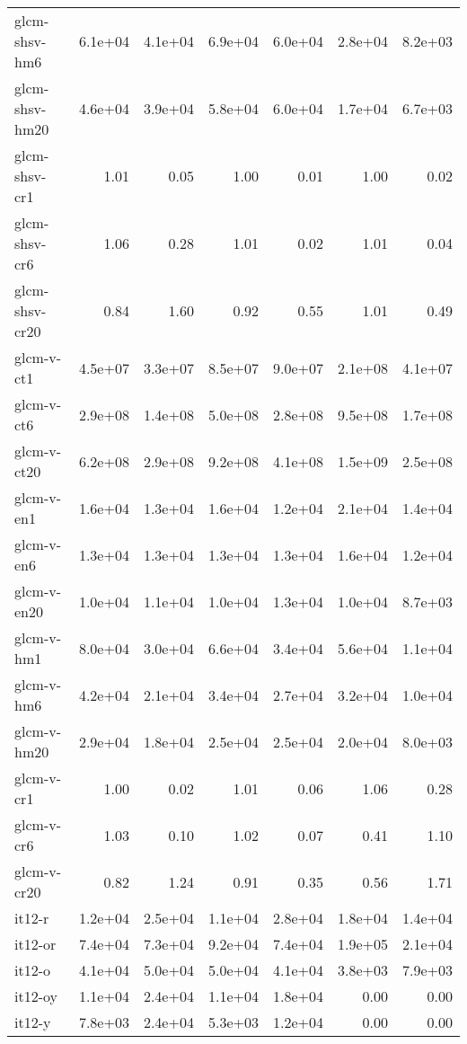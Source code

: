 \begin{tabular}{lrrrrrr}
glcm-shsv-hm6       & 6.1e+04 & 4.1e+04 & 6.9e+04 & 6.0e+04 & 2.8e+04 & 8.2e+03 \\
glcm-shsv-hm20      & 4.6e+04 & 3.9e+04 & 5.8e+04 & 6.0e+04 & 1.7e+04 & 6.7e+03 \\
glcm-shsv-cr1       &    1.01 &    0.05 &    1.00 &    0.01 &    1.00 &    0.02 \\
glcm-shsv-cr6       &    1.06 &    0.28 &    1.01 &    0.02 &    1.01 &    0.04 \\
glcm-shsv-cr20      &    0.84 &    1.60 &    0.92 &    0.55 &    1.01 &    0.49 \\
glcm-v-ct1          & 4.5e+07 & 3.3e+07 & 8.5e+07 & 9.0e+07 & 2.1e+08 & 4.1e+07 \\
glcm-v-ct6          & 2.9e+08 & 1.4e+08 & 5.0e+08 & 2.8e+08 & 9.5e+08 & 1.7e+08 \\
glcm-v-ct20         & 6.2e+08 & 2.9e+08 & 9.2e+08 & 4.1e+08 & 1.5e+09 & 2.5e+08 \\
glcm-v-en1          & 1.6e+04 & 1.3e+04 & 1.6e+04 & 1.2e+04 & 2.1e+04 & 1.4e+04 \\
glcm-v-en6          & 1.3e+04 & 1.3e+04 & 1.3e+04 & 1.3e+04 & 1.6e+04 & 1.2e+04 \\
glcm-v-en20         & 1.0e+04 & 1.1e+04 & 1.0e+04 & 1.3e+04 & 1.0e+04 & 8.7e+03 \\
glcm-v-hm1          & 8.0e+04 & 3.0e+04 & 6.6e+04 & 3.4e+04 & 5.6e+04 & 1.1e+04 \\
glcm-v-hm6          & 4.2e+04 & 2.1e+04 & 3.4e+04 & 2.7e+04 & 3.2e+04 & 1.0e+04 \\
glcm-v-hm20         & 2.9e+04 & 1.8e+04 & 2.5e+04 & 2.5e+04 & 2.0e+04 & 8.0e+03 \\
glcm-v-cr1          &    1.00 &    0.02 &    1.01 &    0.06 &    1.06 &    0.28 \\
glcm-v-cr6          &    1.03 &    0.10 &    1.02 &    0.07 &    0.41 &    1.10 \\
glcm-v-cr20         &    0.82 &    1.24 &    0.91 &    0.35 &    0.56 &    1.71 \\
it12-r              & 1.2e+04 & 2.5e+04 & 1.1e+04 & 2.8e+04 & 1.8e+04 & 1.4e+04 \\
it12-or             & 7.4e+04 & 7.3e+04 & 9.2e+04 & 7.4e+04 & 1.9e+05 & 2.1e+04 \\
it12-o              & 4.1e+04 & 5.0e+04 & 5.0e+04 & 4.1e+04 & 3.8e+03 & 7.9e+03 \\
it12-oy             & 1.1e+04 & 2.4e+04 & 1.1e+04 & 1.8e+04 &    0.00 &    0.00 \\
it12-y              & 7.8e+03 & 2.4e+04 & 5.3e+03 & 1.2e+04 &    0.00 &    0.00 \\

\end{tabular}
